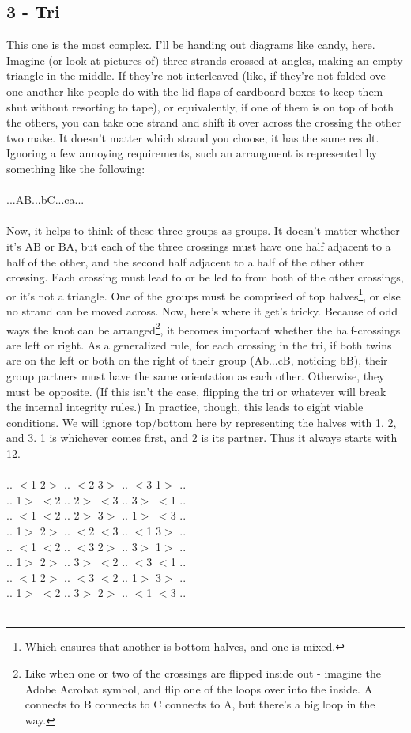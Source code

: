 \documentclass[twoside]{report}
\begin{document}
\subsection{3 - Tri}
This one is the most complex.  I'll be handing out diagrams like candy, here.  Imagine (or look at pictures of) three strands crossed at angles, making an empty triangle in the middle.  If they're not interleaved (like, if they're not folded ove one another like people do with the lid flaps of cardboard boxes to keep them shut without resorting to tape), or equivalently, if one of them is on top of both the others, you can take one strand and shift it over across the crossing the other two make.  It doesn't matter which strand you choose, it has the same result.  Ignoring a few annoying requirements, such an arrangment is represented by something like the following:\\\\
...AB...bC...ca...\\\\

Now, it helps to think of these three groups as groups.  It doesn't matter whether it's AB or BA, but each of the three crossings must have one half adjacent to a half of the other, and the second half adjacent to a half of the other other crossing.  Each crossing must lead to or be led to from both of the other crossings, or it's not a triangle.  One of the groups must be comprised of top halves\footnote{Which ensures that another is bottom halves, and one is mixed.}, or else no strand can be moved across.  Now, here's where it get's tricky.  Because of odd ways the knot can be arranged\footnote{Like when one or two of the crossings are flipped inside out - imagine the Adobe Acrobat symbol, and flip one of the loops over into the inside.  A connects to B connects to C connects to A, but there's a big loop in the way.}, it becomes important whether the half-crossings are left or right.  As a generalized rule, for each crossing in the tri, if both twins are on the left or both on the right of their group (Ab...cB, noticing bB), their group partners must have the same orientation as each other.  Otherwise, they must be opposite.  (If this isn't the case, flipping the tri or whatever will break the internal integrity rules.)  In practice, though, this leads to eight viable conditions.  We will ignore top/bottom here by representing the halves with 1, 2, and 3.  1 is whichever comes first, and 2 is its partner.  Thus it always starts with 12.\\\\
.. $<$1 2$>$ .. $<$2 3$>$ .. $<$3 1$>$ ..\\
.. 1$>$ $<$2 .. 2$>$ $<$3 .. 3$>$ $<$1 ..\\
.. $<$1 $<$2 .. 2$>$ 3$>$ .. 1$>$ $<$3 ..\\
.. 1$>$ 2$>$ .. $<$2 $<$3 .. $<$1 3$>$ ..\\
.. $<$1 $<$2 .. $<$3 2$>$ .. 3$>$ 1$>$ ..\\
.. 1$>$ 2$>$ .. 3$>$ $<$2 .. $<$3 $<$1 ..\\
.. $<$1 2$>$ .. $<$3 $<$2 .. 1$>$ 3$>$ ..\\
.. 1$>$ $<$2 .. 3$>$ 2$>$ .. $<$1 $<$3 ..\\\\
\end{document}
